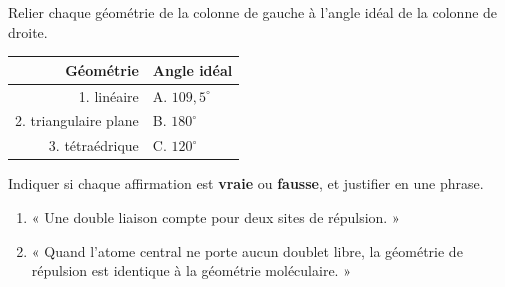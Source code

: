 \documentclass[11pt,a4paper]{article}
\begin{document}
\begin{exo}
Relier chaque géométrie de la colonne de gauche à l'angle idéal de la colonne de droite.
\begin{center}
\renewcommand{\arraystretch}{1.3}
\begin{tabular}{r@{\qquad}l}
\textbf{Géométrie} & \textbf{Angle idéal}\\
\hline
1. linéaire            & A. $109{,}5^\circ$\\
2. triangulaire plane  & B. $180^\circ$\\
3. tétraédrique        & C. $120^\circ$\\
\end{tabular}
\end{center}
\end{exo}

\begin{exo}
Indiquer si chaque affirmation est \textbf{vraie} ou \textbf{fausse}, et justifier en une phrase.
\begin{enumerate}[label=\alph*),leftmargin=2em,itemsep=2pt]
  \item « Une double liaison compte pour deux sites de répulsion. »
  \item « Quand l'atome central ne porte aucun doublet libre, la géométrie de répulsion est
        identique à la géométrie moléculaire. »
\end{enumerate}
\end{exo}
\end{document}
